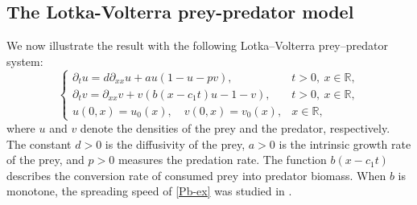 \documentclass[10pt]{article}
\numberwithin{equation}{section}
\begin{document}
  






\subsection{The Lotka-Volterra prey-predator model}
We now illustrate the result with the following Lotka–Volterra prey–predator system:
\begin{equation}\label{Pb-ex}
\begin{cases}
\partial_t u=d\partial_{xx}u+au(1-u-pv), & t>0,\ x\in\mathbb R,\\
\partial_t v=\partial_{xx}v+v(b(x-c_1t)u-1-v), & t>0,\ x\in\mathbb R,\\
u(0,x)=u_0(x),\quad v(0,x)=v_0(x), & x\in\mathbb R,
\end{cases}
\end{equation}
where \(u\) and \(v\) denote the densities of the prey and the predator, respectively. The constant \(d>0\) is the diffusivity of the prey, \(a>0\) is the intrinsic growth rate of the prey, and \(p>0\) measures the predation rate. The function \(b(x-c_1t)\) describes the conversion rate of consumed prey into predator biomass. When \(b\) is monotone, the spreading speed of  \eqref{Pb-ex}  was studied in \cite{LamLee2024pp}.
\end{document}
